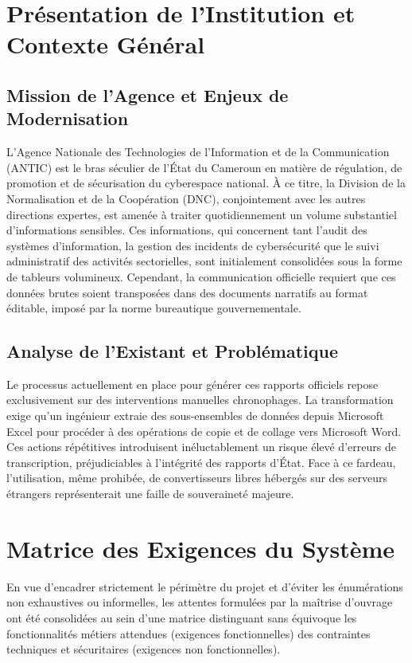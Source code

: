 \documentclass[12pt,a4paper,twoside]{report}
\begin{document}
\tableofcontents
\newpage

\chapter{Présentation de l'Institution et Contexte Général}

\section{Mission de l'Agence et Enjeux de Modernisation}
L'Agence Nationale des Technologies de l'Information et de la Communication (ANTIC) est le bras séculier de l'État du Cameroun en matière de régulation, de promotion et de sécurisation du cyberespace national. À ce titre, la Division de la Normalisation et de la Coopération (DNC), conjointement avec les autres directions expertes, est amenée à traiter quotidiennement un volume substantiel d'informations sensibles. Ces informations, qui concernent tant l'audit des systèmes d'information, la gestion des incidents de cybersécurité que le suivi administratif des activités sectorielles, sont initialement consolidées sous la forme de tableurs volumineux. Cependant, la communication officielle requiert que ces données brutes soient transposées dans des documents narratifs au format éditable, imposé par la norme bureautique gouvernementale.

\section{Analyse de l'Existant et Problématique}
Le processus actuellement en place pour générer ces rapports officiels repose exclusivement sur des interventions manuelles chronophages. La transformation exige qu'un ingénieur extraie des sous-ensembles de données depuis Microsoft Excel pour procéder à des opérations de copie et de collage vers Microsoft Word. Ces actions répétitives introduisent inéluctablement un risque élevé d'erreurs de transcription, préjudiciables à l'intégrité des rapports d'État. Face à ce fardeau, l'utilisation, même prohibée, de convertisseurs libres hébergés sur des serveurs étrangers représenterait une faille de souveraineté majeure.


\chapter{Matrice des Exigences du Système}

En vue d'encadrer strictement le périmètre du projet et d'éviter les énumérations non exhaustives ou informelles, les attentes formulées par la maîtrise d'ouvrage ont été consolidées au sein d'une matrice distinguant sans équivoque les fonctionnalités métiers attendues (exigences fonctionnelles) des contraintes techniques et sécuritaires (exigences non fonctionnelles).
\end{document}
